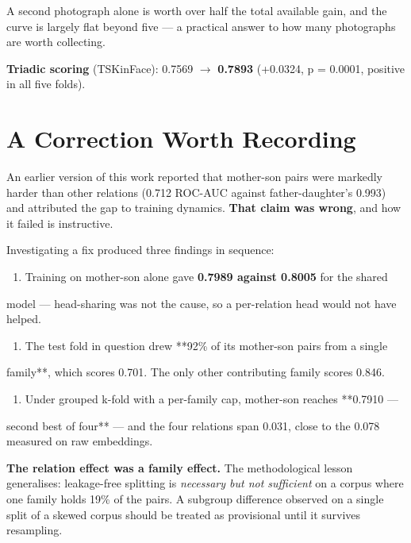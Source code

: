 \documentclass[11pt,a4paper]{article}
\begin{document}
A second photograph alone is worth over half the total available gain, and the
curve is largely flat beyond five — a practical answer to how many photographs
are worth collecting.

\textbf{Triadic scoring} (TSKinFace): 0.7569 $\rightarrow$ \textbf{0.7893} (+0.0324, p = 0.0001,
positive in all five folds).



\section*{A Correction Worth Recording}

An earlier version of this work reported that mother-son pairs were markedly
harder than other relations (0.712 ROC-AUC against father-daughter's 0.993) and
attributed the gap to training dynamics. \textbf{That claim was wrong}, and how it
failed is instructive.

Investigating a fix produced three findings in sequence:

\begin{enumerate}\setlength{\itemsep}{2pt}
\item Training on mother-son alone gave \textbf{0.7989 against 0.8005} for the shared
\end{enumerate}

   model — head-sharing was not the cause, so a per-relation head would not
   have helped.
\begin{enumerate}\setlength{\itemsep}{2pt}
\item The test fold in question drew **92\% of its mother-son pairs from a single
\end{enumerate}

   family**, which scores 0.701. The only other contributing family scores
   0.846.
\begin{enumerate}\setlength{\itemsep}{2pt}
\item Under grouped k-fold with a per-family cap, mother-son reaches **0.7910 —
\end{enumerate}

   second best of four** — and the four relations span 0.031, close to the
   0.078 measured on raw embeddings.

\textbf{The relation effect was a family effect.} The methodological lesson
generalises: leakage-free splitting is \emph{necessary but not sufficient} on a
corpus where one family holds 19\% of the pairs. A subgroup difference observed
on a single split of a skewed corpus should be treated as provisional until it
survives resampling.
\end{document}
